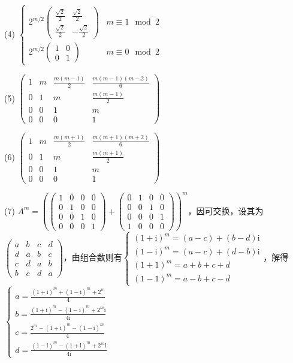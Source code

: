 \documentclass[a4paper,UTF8,fontset=windows]{ctexart}
\begin{document}
\begin{enumerate}
(4) $\begin{cases}2^{m/2}\begin{pmatrix}\frac{\sqrt2}{2}&\frac{\sqrt2}{2}\\[1.5ex]\frac{\sqrt2}{2}&-\frac{\sqrt2}{2}\end{pmatrix}&m\equiv1\mod2\\2^{m/2}\begin{pmatrix}1&0\\0&1\end{pmatrix}&m\equiv0\mod2\end{cases}$

(5) $\begin{pmatrix}1&m&\frac{m(m-1)}{2}&\frac{m(m-1)(m-2)}{6}\\[1.5ex]0&1&m&\frac{m(m-1)}{2}\\[1.5ex]0&0&1&m\\0&0&0&1\end{pmatrix}$

(6) $\begin{pmatrix}1&m&\frac{m(m+1)}{2}&\frac{m(m+1)(m+2)}{6}\\[1.5ex]0&1&m&\frac{m(m+1)}{2}\\[1.5ex]0&0&1&m\\0&0&0&1\end{pmatrix}$

(7) $A^m=\left(\begin{pmatrix}1&0&0&0\\0&1&0&0\\0&0&1&0\\0&0&0&1\end{pmatrix}+\begin{pmatrix}0&1&0&0\\0&0&1&0\\0&0&0&1\\1&0&0&0\end{pmatrix}\right)^m$，因可交换，设其为$\begin{pmatrix}a&b&c&d\\d&a&b&c\\c&d&a&b\\b&c&d&a\end{pmatrix}$，由组合数则有$ \begin{cases}(1+\mathrm{i})^m=(a-c)+(b-d)\mathrm{i}\\(1-\mathrm{i})^m=(a-c)+(d-b)\mathrm{i}\\(1+1)^m=a+b+c+d\\(1-1)^m=a-b+c-d\end{cases}$，解得$\begin{cases}a=\frac{(1+\mathrm{i})^m+(1-\mathrm{i})^m+2^m}{4}\\[1.5ex]b=\frac{(1+\mathrm{i})^m-(1-\mathrm{i})^m+2^m\mathrm{i}}{4\mathrm{i}}\\[1.5ex]c=\frac{2^m-(1+\mathrm{i})^m-(1-\mathrm{i})^m}{4}\\[1.5ex]d=\frac{(1-\mathrm{i})^m-(1+\mathrm{i})^m+2^m\mathrm{i}}{4\mathrm{i}}\end{cases}$


\end{enumerate}
\end{document}
